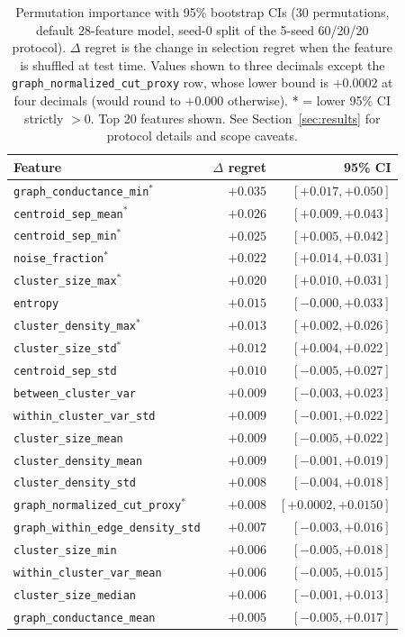 \documentclass[10pt]{article} %
\begin{document}
\begin{table}[h]
\centering
\caption{Permutation importance with 95\% bootstrap CIs (30 permutations, default 28-feature model, seed-0 split of the 5-seed 60/20/20 protocol). $\Delta$ regret is the change in selection regret when the feature is shuffled at test time. Values shown to three decimals except the \texttt{graph\_normalized\_cut\_proxy} row, whose lower bound is $+0.0002$ at four decimals (would round to $+0.000$ otherwise). * = lower 95\% CI strictly $> 0$. Top 20 features shown. See Section~\ref{sec:results} for protocol details and scope caveats.}
\label{tab:app_perm_importance}
\small
\begin{tabular}{lrr}
\toprule
\textbf{Feature} & $\Delta$ \textbf{regret} & \textbf{95\% CI} \\
\midrule
\texttt{graph\_conductance\_min}$^{*}$ & $+0.035$ & $[+0.017, +0.050]$ \\
\texttt{centroid\_sep\_mean}$^{*}$ & $+0.026$ & $[+0.009, +0.043]$ \\
\texttt{centroid\_sep\_min}$^{*}$ & $+0.025$ & $[+0.005, +0.042]$ \\
\texttt{noise\_fraction}$^{*}$ & $+0.022$ & $[+0.014, +0.031]$ \\
\texttt{cluster\_size\_max}$^{*}$ & $+0.020$ & $[+0.010, +0.031]$ \\
\texttt{entropy} & $+0.015$ & $[-0.000, +0.033]$ \\
\texttt{cluster\_density\_max}$^{*}$ & $+0.013$ & $[+0.002, +0.026]$ \\
\texttt{cluster\_size\_std}$^{*}$ & $+0.012$ & $[+0.004, +0.022]$ \\
\texttt{centroid\_sep\_std} & $+0.010$ & $[-0.005, +0.027]$ \\
\texttt{between\_cluster\_var} & $+0.009$ & $[-0.003, +0.023]$ \\
\texttt{within\_cluster\_var\_std} & $+0.009$ & $[-0.001, +0.022]$ \\
\texttt{cluster\_size\_mean} & $+0.009$ & $[-0.005, +0.022]$ \\
\texttt{cluster\_density\_mean} & $+0.009$ & $[-0.001, +0.019]$ \\
\texttt{cluster\_density\_std} & $+0.008$ & $[-0.004, +0.018]$ \\
\texttt{graph\_normalized\_cut\_proxy}$^{*}$ & $+0.008$ & $[+0.0002, +0.0150]$ \\
\texttt{graph\_within\_edge\_density\_std} & $+0.007$ & $[-0.003, +0.016]$ \\
\texttt{cluster\_size\_min} & $+0.006$ & $[-0.005, +0.018]$ \\
\texttt{within\_cluster\_var\_mean} & $+0.006$ & $[-0.005, +0.015]$ \\
\texttt{cluster\_size\_median} & $+0.006$ & $[-0.001, +0.013]$ \\
\texttt{graph\_conductance\_mean} & $+0.005$ & $[-0.005, +0.017]$ \\
\bottomrule
\end{tabular}
\end{table}
\end{document}
